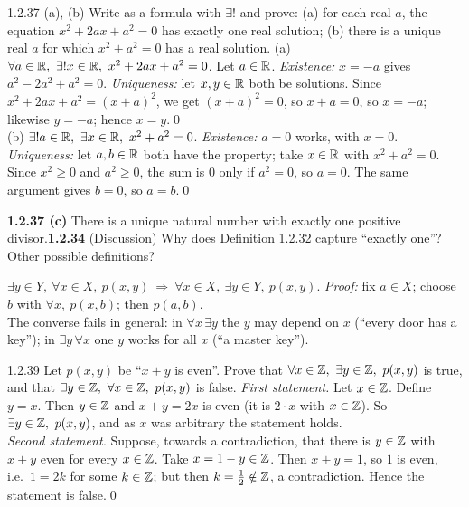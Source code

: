 \begin{bookex}[recommended]{1.2.37 (a), (b)}
Write as a formula with $\exists!$ and prove: (a) for each real $a$, the equation $x^2+2ax+a^2=0$ has exactly one real solution; (b) there is a unique real $a$ for which $x^2+a^2=0$ has a real solution.
\solution
(a) $\forall a\in\R,\ \exists!x\in\R,\ x^2+2ax+a^2=0$. Let $a\in\mathbb{R}$. \emph{Existence:} $x=-a$ gives $a^2-2a^2+a^2=0$. \emph{Uniqueness:} let $x,y\in\mathbb{R}$ both be solutions. Since $x^2+2ax+a^2=(x+a)^2$, we get $(x+a)^2=0$, so $x+a=0$, so $x=-a$; likewise $y=-a$; hence $x=y$.\qed\\
(b) $\exists!a\in\R,\ \exists x\in\R,\ x^2+a^2=0$. \emph{Existence:} $a=0$ works, with $x=0$. \emph{Uniqueness:} let $a,b\in\mathbb{R}$ both have the property; take $x\in\mathbb{R}$ with $x^2+a^2=0$. Since $x^2\ge0$ and $a^2\ge0$, the sum is $0$ only if $a^2=0$, so $a=0$. The same argument gives $b=0$, so $a=b$.\qed
\end{bookex}

\begin{trybox}[{1.2.37 (c), 1.2.34 \fO}]
\textbf{1.2.37 (c)} There is a unique natural number with exactly one positive divisor.\quad \textbf{1.2.34} (Discussion) Why does Definition 1.2.32 capture ``exactly one''? Other possible definitions?
\end{trybox}

\begin{result}[{Theorem 1.2.40}]
$\exists y\in Y,\ \forall x\in X,\ p(x,y)\ \Rightarrow\ \forall x\in X,\ \exists y\in Y,\ p(x,y)$. \emph{Proof:} fix $a\in X$; choose $b$ with $\forall x,\ p(x,b)$; then $p(a,b)$. \\
The converse fails in general: in $\forall x\,\exists y$ the $y$ may depend on $x$ (``every door has a key''); in $\exists y\,\forall x$ one $y$ works for all $x$ (``a master key'').
\end{result}

\begin{bookex}[essential]{1.2.39}
Let $p(x,y)$ be ``$x+y$ is even''. Prove that $\forall x\in\mathbb{Z},\ \exists y\in\mathbb{Z},\ p(x,y)$ is true, and that $\exists y\in\mathbb{Z},\ \forall x\in\mathbb{Z},\ p(x,y)$ is false.
\solution
\emph{First statement.} Let $x\in\mathbb{Z}$. Define $y=x$. Then $y\in\mathbb{Z}$ and $x+y=2x$ is even (it is $2\cdot x$ with $x\in\mathbb{Z}$). So $\exists y\in\mathbb{Z},\ p(x,y)$, and as $x$ was arbitrary the statement holds.\\
\emph{Second statement.} Suppose, towards a contradiction, that there is $y\in\mathbb{Z}$ with $x+y$ even for every $x\in\mathbb{Z}$. Take $x=1-y\in\mathbb{Z}$. Then $x+y=1$, so $1$ is even, i.e.\ $1=2k$ for some $k\in\mathbb{Z}$; but then $k=\frac12\notin\mathbb{Z}$, a contradiction. Hence the statement is false.\qed
\end{bookex}
